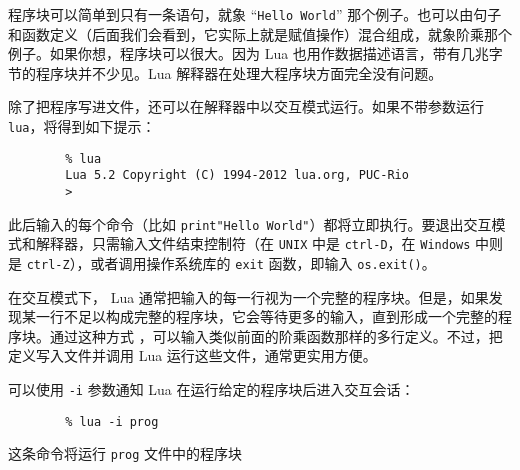 程序块可以简单到只有一条语句，就象 “\verb|Hello World|” 那个例子。也可以由句子和函数定义（后面我们会看到，它实际上就是赋值操作）混合组成，就象阶乘那个例子。如果你想，程序块可以很大。因为 Lua 也用作数据描述语言，带有几兆字节的程序块并不少见。Lua 解释器在处理大程序块方面完全没有问题。

除了把程序写进文件，还可以在解释器中以交互模式运行。如果不带参数运行 \verb|lua|，将得到如下提示：

\begin{verbatim}
        % lua  
        Lua 5.2 Copyright (C) 1994-2012 lua.org, PUC-Rio
        >
\end{verbatim}

此后输入的每个命令（比如 \verb|print"Hello World"|）都将立即执行。要退出交互模式和解释器，只需输入文件结束控制符（在 \verb|UNIX| 中是 \verb|ctrl-D|，在 \verb|Windows| 中则是 \verb|ctrl-Z|），或者调用操作系统库的 \verb|exit| 函数，即输入 \verb|os.exit()|。

在交互模式下， Lua 通常把输入的每一行视为一个完整的程序块。但是，如果发现某一行不足以构成完整的程序块，它会等待更多的输入，直到形成一个完整的程序块。通过这种方式 ，可以输入类似前面的阶乘函数那样的多行定义。不过，把定义写入文件并调用 Lua 运行这些文件，通常更实用方便。

可以使用 \verb|-i| 参数通知 Lua 在运行给定的程序块后进入交互会话：

\begin{verbatim}
        % lua -i prog
\end{verbatim}

这条命令将运行 \verb|prog| 文件中的程序块